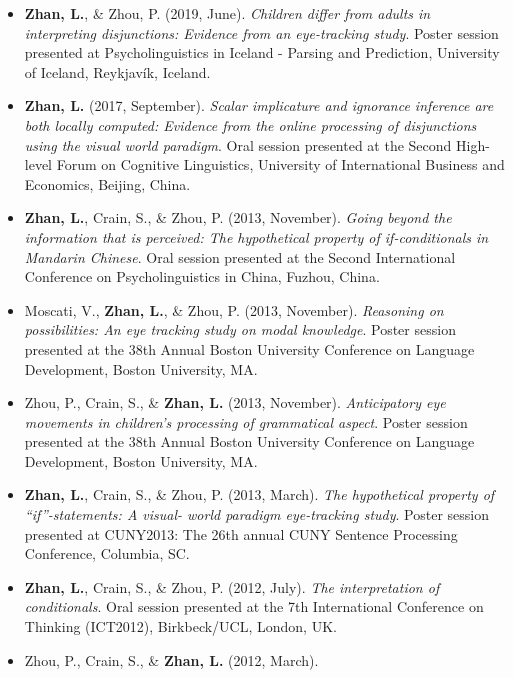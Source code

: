 \documentclass[
  12pt,
]{article}
\begin{document}
\begin{itemize}
\item
  \textbf{Zhan, L.}, \& Zhou, P. (2019, June). \emph{Children differ
  from adults in interpreting disjunctions: Evidence from an
  eye-tracking study}. Poster session presented at Psycholinguistics in
  Iceland - Parsing and Prediction, University of Iceland, Reykjavík,
  Iceland. \href{https://publications.likan.info/Talks/PIPP_Poster.pdf}{
  \faFilePdf[regular] }
\item
  \textbf{Zhan, L.} (2017, September). \emph{Scalar implicature and
  ignorance inference are both locally computed: Evidence from the
  online processing of disjunctions using the visual world paradigm}.
  Oral session presented at the Second High-level Forum on Cognitive
  Linguistics, University of International Business and Economics,
  Beijing, China.
  \href{https://publications.likan.info/Talks/ZhanL2017UIBE.pdf}{
  \faFilePdf[regular] }
\item
  \textbf{Zhan, L.}, Crain, S., \& Zhou, P. (2013, November).
  \emph{Going beyond the information that is perceived: The hypothetical
  property of if-conditionals in Mandarin Chinese}. Oral session
  presented at the Second International Conference on Psycholinguistics
  in China, Fuzhou, China.
\item
  Moscati, V., \textbf{Zhan, L.}, \& Zhou, P. (2013, November).
  \emph{Reasoning on possibilities: An eye tracking study on modal
  knowledge}. Poster session presented at the 38th Annual Boston
  University Conference on Language Development, Boston University, MA.
\item
  Zhou, P., Crain, S., \& \textbf{Zhan, L.} (2013, November).
  \emph{Anticipatory eye movements in children's processing of
  grammatical aspect}. Poster session presented at the 38th Annual
  Boston University Conference on Language Development, Boston
  University, MA.
\item
  \textbf{Zhan, L.}, Crain, S., \& Zhou, P. (2013, March). \emph{The
  hypothetical property of ``if''-statements: A visual- world paradigm
  eye-tracking study}. Poster session presented at CUNY2013: The 26th
  annual CUNY Sentence Processing Conference, Columbia, SC.
\item
  \textbf{Zhan, L.}, Crain, S., \& Zhou, P. (2012, July). \emph{The
  interpretation of conditionals}. Oral session presented at the 7th
  International Conference on Thinking (ICT2012), Birkbeck/UCL, London,
  UK.
\item
  Zhou, P., Crain, S., \& \textbf{Zhan, L.} (2012, March).

\end{itemize}
\end{document}
